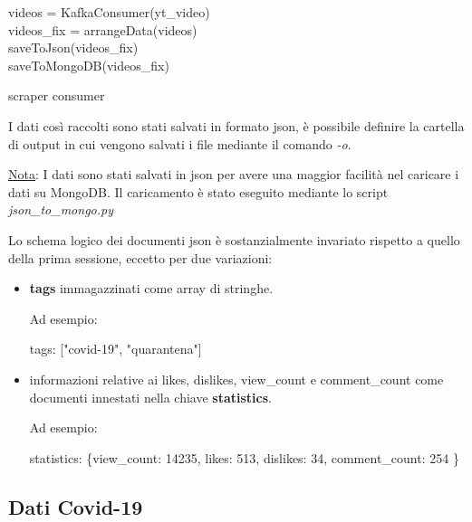 \begin{algorithm}[H]
	\nl {} {
		\nl {}
		{
			\nl videos = KafkaConsumer(yt\_video)\\
			\nl videos\_fix = arrangeData(videos)\\ 
			\nl saveToJson(videos\_fix)\\
			\nl saveToMongoDB(videos\_fix)
		}
	}
	\caption{scraper consumer}
\end{algorithm}
I dati così raccolti sono stati salvati in formato json, è possibile definire la cartella di output in cui vengono salvati i file mediante il comando \textit{-o}. 

\underline{Nota}: I dati sono stati salvati in json per avere una maggior facilità nel caricare i dati su MongoDB. Il caricamento è stato eseguito mediante lo script \textit{json\_to\_mongo.py}

Lo schema logico dei documenti json è sostanzialmente invariato rispetto a quello della prima sessione, eccetto per due variazioni:
\begin{itemize}
	\item \textbf{tags} immagazzinati come array di stringhe.
	
	Ad esempio:
	
	tags: ["covid-19", "quarantena"]
	
	\item informazioni relative ai likes, dislikes, view\_count e comment\_count come documenti innestati nella chiave \textbf{statistics}.
	
	Ad esempio:
	
	statistics: \{view\_count: 14235,
				likes: 513,
				dislikes: 34,
				comment\_count: 254
				\}
\end{itemize}
\subsection*{Dati Covid-19}

